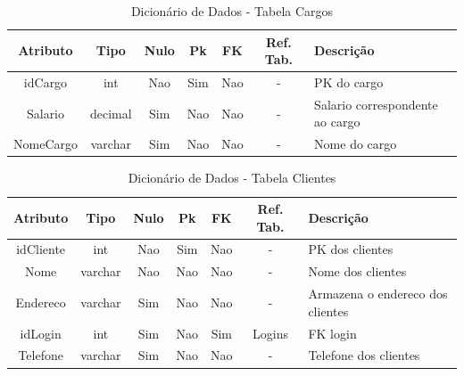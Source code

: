 \documentclass[
	12pt,				%
	openright,			%
	oneside,			%
	a4paper,			%
	chapter=TITLE,		%
	section=TITLE,		%
	english,			%
	brazil				%
	]{abntex2}
\begin{document}
    \begin{table}[htbp]
    \centering
        \caption{Dicionário de Dados - Tabela Cargos}
        \label{tb1_dicionario_dados_cargos}
        \begin{tabular}{|c|c|c|c|c|c|p{3cm}|}
            \hline
            \textbf{Atributo} & 
            \textbf{Tipo} & 
            \textbf{Nulo} & 
            \textbf{Pk} & 
            \textbf{FK} & 
            \textbf{Ref. Tab.} & 
            \textbf{Descrição} \\ \hline
            idCargo & int & Nao & Sim & Nao & - & PK do cargo \\ \hline
            Salario & decimal & Sim & Nao & Nao & - & Salario correspondente ao cargo \\ \hline
            NomeCargo & varchar & Sim & Nao & Nao & - & Nome do cargo \\ \hline
        \end{tabular}
        
    \end{table}
    
    \begin{table}[htbp]
    \centering
        \caption{Dicionário de Dados - Tabela Clientes}
        \label{tb1_dicionario_dados_clientes}
        \begin{tabular}{|c|c|c|c|c|c|p{3cm}|}
            \hline
            \textbf{Atributo} & 
            \textbf{Tipo} & 
            \textbf{Nulo} & 
            \textbf{Pk} & 
            \textbf{FK} & 
            \textbf{Ref. Tab.} & 
            \textbf{Descrição} \\ \hline
            idCliente & int & Nao & Sim & Nao & - & PK dos clientes \\ \hline
            Nome & varchar & Nao & Nao & Nao & - & Nome dos clientes \\ \hline
            Endereco & varchar & Sim & Nao & Nao & - & Armazena o endereco dos clientes \\ \hline
            idLogin & int & Sim & Nao & Sim & Logins & FK login \\ \hline
            Telefone & varchar & Sim & Nao & Nao & - & Telefone dos clientes \\ \hline
        \end{tabular}
    \end{table}
     
\end{document}

